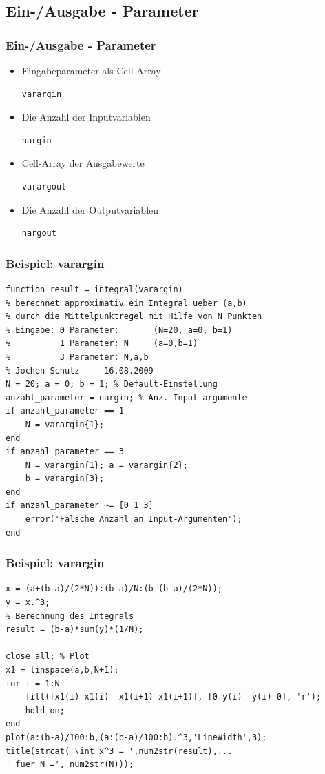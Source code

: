 \documentclass[hyperref={xetex}]{beamer}
\begin{document}
\subsection{Ein-/Ausgabe - Parameter}
%
%
\begin{frame}[fragile]\frametitle{Ein-/Ausgabe - Parameter} 
\begin{itemize}
 \item Eingabeparameter als Cell-Array
\begin{lstlisting}
varargin
\end{lstlisting}
\item Die Anzahl der Inputvariablen
\begin{lstlisting}
nargin
\end{lstlisting}
\item Cell-Array der Ausgabewerte
\begin{lstlisting}
varargout
\end{lstlisting}
\item Die Anzahl der Outputvariablen
\begin{lstlisting}
nargout
\end{lstlisting}
\end{itemize}

\end{frame}
%
%
\begin{frame}[fragile]\frametitle{Beispiel: varargin}
\begin{lstlisting}
function result = integral(varargin)
% berechnet approximativ ein Integral ueber (a,b) 
% durch die Mittelpunktregel mit Hilfe von N Punkten
% Eingabe: 0 Parameter:       (N=20, a=0, b=1)
%          1 Parameter: N     (a=0,b=1)
%          3 Parameter: N,a,b
% Jochen Schulz		16.08.2009
N = 20; a = 0; b = 1; % Default-Einstellung
anzahl_parameter = nargin; % Anz. Input-argumente
if anzahl_parameter == 1 
    N = varargin{1};
end
if anzahl_parameter == 3
    N = varargin{1}; a = varargin{2}; 
    b = varargin{3};
end
if anzahl_parameter ~= [0 1 3]
    error('Falsche Anzahl an Input-Argumenten');
end
\end{lstlisting}
\end{frame}
\begin{frame}[fragile]\frametitle{Beispiel: varargin}
\begin{lstlisting}
x = (a+(b-a)/(2*N)):(b-a)/N:(b-(b-a)/(2*N));
y = x.^3;
% Berechnung des Integrals
result = (b-a)*sum(y)*(1/N);

close all; % Plot
x1 = linspace(a,b,N+1);
for i = 1:N
    fill([x1(i) x1(i)  x1(i+1) x1(i+1)], [0 y(i)  y(i) 0], 'r');
    hold on;
end
plot(a:(b-a)/100:b,(a:(b-a)/100:b).^3,'LineWidth',3);
title(strcat('\int x^3 = ',num2str(result),...
' fuer N =', num2str(N))); 
\end{lstlisting}
\end{frame}
\end{document}
